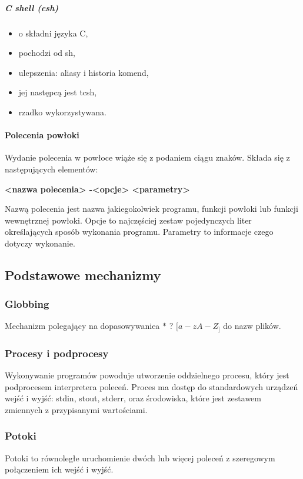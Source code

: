 \documentclass[a4paper,twoside]{report}
\begin{document}
\subparagraph{C shell (csh)}
\begin{itemize}
	\item o składni języka C,
	\item pochodzi od sh,
	\item ulepszenia: aliasy i historia komend,
	\item jej następcą jest tcsh,
	\item rzadko wykorzystywana.
\end{itemize}

\paragraph{Polecenia powłoki\\}

Wydanie polecenia w powłoce wiąże się z podaniem ciągu znaków. Składa się z następujących elementów:
\begin{center}\textbf{<nazwa polecenia> -<opcje> <parametry>}\end{center}

Nazwą polecenia jest nazwa jakiegokolwiek programu, funkcji powłoki lub funkcji   wewnętrznej powłoki. Opcje to najczęściej zestaw pojedynczych liter określających     sposób wykonania programu. Parametry to informacje czego dotyczy wykonanie.

\subsection{Podstawowe mechanizmy}
\subsubsection{Globbing\\}
Mechanizm polegający na dopasowywaniea
$*$ $?$ $[a-z A-Z_]$ do nazw plików.

\subsubsection{Procesy i podprocesy\\}
Wykonywanie programów powoduje utworzenie oddzielnego procesu, który jest podprocesem interpretera poleceń. Proces ma dostęp do standardowych urządzeń wejść i wyjść: stdin, stout, stderr, oraz środowiska, które jest zestawem zmiennych z przypisanymi wartościami.

\subsubsection{Potoki\\}
Potoki to równoległe uruchomienie dwóch lub więcej poleceń z szeregowym połączeniem ich wejść i wyjść.
\end{document}
